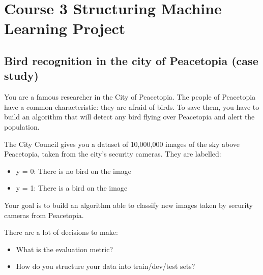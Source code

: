 \documentclass[12pt]{article}
\numberwithin{equation}{section}
\begin{document}
\section{Course 3 Structuring Machine Learning Project} 
\subsection{Bird recognition in the city of Peacetopia (case study)}
You are a famous researcher in the City of Peacetopia. The people of Peacetopia have a common characteristic: they are afraid of birds. To save them, you have to build an algorithm that will detect any bird flying over Peacetopia and alert the population. \par
The City Council gives you a dataset of 10,000,000 images of the sky above Peacetopia, taken from the city's security cameras. They are labelled:
\begin{itemize}
	\item y = 0: There is no bird on the image
	\item y = 1: There is a bird on the image
\end{itemize}
Your goal is to build an algorithm able to classify new images taken by security cameras from Peacetopia.\par
There are a lot of decisions to make:
\begin{itemize}
	\item What is the evaluation metric?
	\item How do you structure your data into train/dev/test sets?
\end{itemize}
\end{document}
